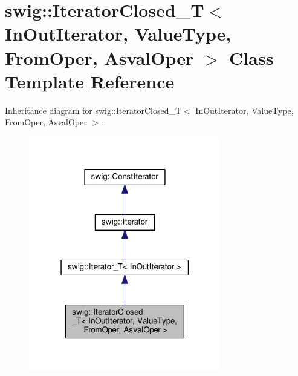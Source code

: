 \hypertarget{classswig_1_1IteratorClosed__T}{}\section{swig\+:\+:Iterator\+Closed\+\_\+T$<$ In\+Out\+Iterator, Value\+Type, From\+Oper, Asval\+Oper $>$ Class Template Reference}
\label{classswig_1_1IteratorClosed__T}


Inheritance diagram for swig\+:\+:Iterator\+Closed\+\_\+T$<$ In\+Out\+Iterator, Value\+Type, From\+Oper, Asval\+Oper $>$\+:
\nopagebreak
\begin{figure}[H]
\begin{center}
\leavevmode
\includegraphics[width=238pt]{classswig_1_1IteratorClosed__T__inherit__graph}
\end{center}
\end{figure}


